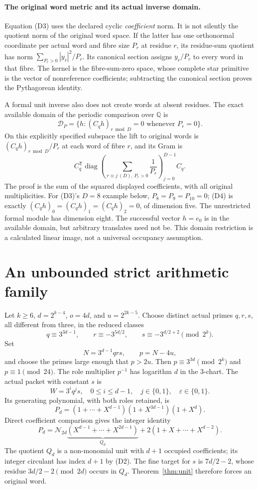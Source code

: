 \paragraph{The original word metric and its actual inverse domain.}
Equation (D3) uses the declared cyclic \emph{coefficient} norm. It is not
silently the quotient norm of the original word space. If the latter has one
orthonormal coordinate per actual word and fibre size $P_r$ at residue $r$,
its residue-sum quotient has norm $\sum_{P_r>0}|y_r|^2/P_r$. Its canonical
section assigns $y_r/P_r$ to every word in that fibre. The kernel is the
fibre-sum-zero space, whose complete star primitive is the vector of
nonreference coefficients; subtracting the canonical section proves the
Pythagorean identity.

A formal unit inverse also does not create words at absent residues. The exact
available domain of the periodic comparison over $\mathbb Q$ is
\[
 \mathcal D_P=\{h:(C_qh)_{r\bmod D}=0\text{ whenever }P_r=0\}.
                                                               \tag{D4}
\]
On this explicitly specified subspace the lift to original words is
$(C_qh)_{r\bmod D}/P_r$ at each word of fibre $r$, and its Gram is
\[
 \boxed{C_q^{\mathsf T}\operatorname{diag}\!\left(
 \sum_{r\equiv j\ (D),\,P_r>0}\frac1{P_r}\right)_{j=0}^{D-1} C_q.} \tag{D5}
\]
The proof is the sum of the squared displayed coefficients, with all original
multiplicities. For (D3)'s $D=8$ example below, $P_8=P_9=P_{10}=0$; (D4) is
exactly $(C_qh)_0=(C_qh)_1=(C_qh)_2=0$, of dimension five. The unrestricted
formal module has dimension eight. The successful vector $h=e_0$ is in the
available domain, but arbitrary translates need not be. This domain restriction
is a calculated linear image, not a universal occupancy assumption.

\section{An unbounded strict arithmetic family}
Let $k\ge6$, $d=2^{k-4}$, $o=4d$, and $u=2^{2k-5}$. Choose distinct actual
primes $q,r,s$, all different from three, in the reduced classes
\[
 q\equiv3^{3d-1},\qquad r\equiv-3^{5d/2},\qquad
 s\equiv-3^{d/2+2}\pmod{2^k}.                              \tag{E1}
\]
Set
\[
 N=3^{d-1}qrs,\qquad p=N-4u,
\]
and choose the primes large enough that $p>2u$. Then
$p\equiv3^{3d}\pmod{2^k}$ and $p\equiv1\pmod{24}$.
The role multiplier $p^{-1}$ has logarithm $d$ in the $3$-chart.
The actual packet with constant $s$ is
\[
 W=3^iq^js,
 \quad0\le i\le d-1,\quad j\in\{0,1\},\quad\varepsilon\in\{0,1\}.
\]
Its generating polynomial, with both roles retained, is
\[
 P_d=(1+\cdots+X^{d-1})(1+X^{3d-1})(1+X^d).
\]
Direct coefficient comparison gives the integer identity
\[
 \boxed{
 P_d=\mathcal N_{2d}\underbrace{(X^{d-1}+\cdots+X^{2d-1})}_{Q_d}
       +2(1+X+\cdots+X^{d-2}).}                           \tag{E2}
\]
The quotient $Q_d$ is a non-monomial unit with $d+1$ occupied coefficients;
its integer circulant has index $d+1$ by (D2).
The fine target for $s$ is $7d/2-2$, whose residue $3d/2-2\pmod{2d}$ occurs
in $Q_d$. Theorem~\ref{thm:unit} therefore forces an original word.

